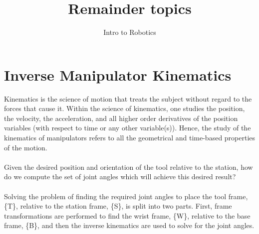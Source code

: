 \documentclass{article}
\title{Remainder topics}
\author{Intro to Robotics}
\date{}
\begin{document}
\maketitle

\section{Inverse Manipulator Kinematics}
Kinematics is the science of motion that treats the subject without regard to the
forces that cause it. Within the science of kinematics, one studies the position, the
velocity, the acceleration, and all higher order derivatives of the position variables
(with respect to time or any other variable(s)). Hence, the study of the kinematics of
manipulators refers to all the geometrical and time-based properties of the motion.
\\\\
 Given the desired position and orientation of the tool relative to the
station, how do we compute the set of joint angles which will achieve this desired
result? \\\\
Solving the problem of finding the required joint angles to place the tool
frame, \{T\}, relative to the station frame, \{S\}, is split into two parts. First, frame
transformations are performed to find the wrist frame, \{W\}, relative to the base
frame, \{B\}, and then the inverse kinematics are used to solve for the joint angles.
\end{document}
